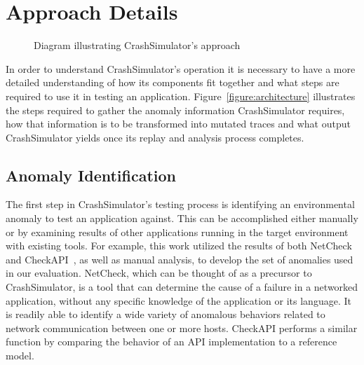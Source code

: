 \section{Approach Details}
\label{SEC:approach}

\begin{figure}[t]
  \center{}
  \caption{Diagram illustrating CrashSimulator's approach}
  \label{figure:approach}
\end{figure}

In order to understand CrashSimulator's operation it is necessary to have a
more detailed understanding of how its components fit together and what
steps are required to use it in testing an application.
Figure~\ref{figure:architecture} illustrates the steps required to gather
the anomaly information CrashSimulator requires, how that information is to
be transformed into mutated traces and what output CrashSimulator yields
once its replay and analysis process completes.

\subsection{Anomaly Identification} \label{subsec:anomalyidentification}

The first step in CrashSimulator's testing process is identifying an
environmental anomaly to test an application against.  This can be
accomplished either manually or by examining results of other applications
running in the target environment with existing tools.  For example, this
work utilized the results of both NetCheck~\cite{Zhuang_NSDI_2014} and
CheckAPI~\cite{rasley2015detecting}, as well as manual analysis, to develop
the set of anomalies used in our evaluation.  NetCheck, which can be
thought of as a precursor to CrashSimulator, is a tool that can determine
the cause of a failure in a networked application, without any specific
knowledge of the application or its language. It is readily able to
identify a wide variety of anomalous behaviors related to network
communication between one or more hosts.  CheckAPI performs a similar
function by comparing the behavior of an API implementation to a reference
model.








